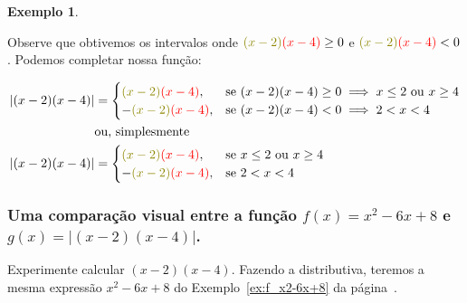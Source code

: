 \documentclass[12pt,openright,twoside,a4paper]{article}
\theoremstyle{definition}
\newtheorem{example}{Exemplo}[section]
\begin{document}
\begin{example}
\begin{center}
		\end{center}
		
		Observe que obtivemos os intervalos onde ${\textcolor{olive}{(x-2)}}{\textcolor{red}{(x-4)}} \geq 0$ e ${\textcolor{olive}{(x-2)}}{\textcolor{red}{(x-4)}} < 0$. Podemos completar nossa função:
		
		\begin{align*}
			|(x-2)(x-4)| &=
			\begin{cases}
				{\textcolor{olive}{(x-2)}}{\textcolor{red}{(x-4)}}, & \text{se } (x-2)(x-4) \geq 0 \implies x \leq 2 \text{ ou } x \geq 4\\
				- {\textcolor{olive}{(x-2)}}{\textcolor{red}{(x-4)}}, & \text{se }  (x-2)(x-4) < 0 \implies 2 < x < 4
			\end{cases}\\
			& \text{ou, simplesmente}\\
			|(x-2)(x-4)| &=
			\begin{cases}
				{\textcolor{olive}{(x-2)}}{\textcolor{red}{(x-4)}}, & \text{se } x \leq 2 \text{ ou } x \geq 4\\
				- {\textcolor{olive}{(x-2)}}{\textcolor{red}{(x-4)}}, & \text{se }   2 < x < 4
			\end{cases}
		\end{align*}
	\end{example}
	
	\subsubsection{Uma comparação visual entre a função $f(x) = x^2-6x+8$ e $g(x) = |(x-2)(x-4)|$.}
	
	Experimente calcular $(x-2)(x-4)$. Fazendo a distributiva, teremos a mesma expressão $x^2-6x+8$ do Exemplo~\ref{ex:f_x2-6x+8} da página~\pageref{ex:f_x2-6x+8}.
	
\end{document}
